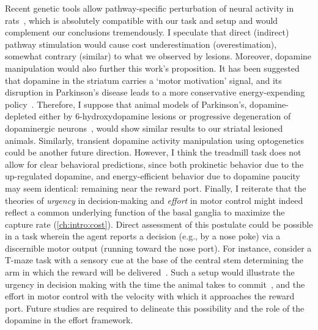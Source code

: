 Recent genetic tools allow pathway-specific perturbation of neural activity in rats~\cite{Pettibone2019eNeuro}, which is absolutely compatible with our task and setup and would complement our conclusions tremendously.
I speculate that direct (indirect) pathway stimulation would cause cost underestimation (overestimation), somewhat contrary (similar) to what we observed by lesions.
Moreover, dopamine manipulation would also further this work's proposition.
It has been suggested that dopamine in the striatum carries a `motor motivation' signal, and its disruption in Parkinson's disease leads to a more conservative energy-expending policy~\cite{Mazzoni2007}.
Therefore, I suppose that animal models of Parkinson's, dopamine-depleted either by 6-hydroxydopamine lesions or progressive degeneration of dopaminergic neurons~\cite{Panigrahi2015Cell}, would show similar results to our striatal lesioned animals.
Similarly, transient dopamine activity manipulation using optogenetics could be another future direction.
However, I think the treadmill task does not allow for clear behavioral predictions, since both prokinetic behavior due to the up-regulated dopamine, and energy-efficient behavior due to dopamine paucity may seem identical:
remaining near the reward port.
Finally, I reiterate that the theories of \emph{urgency} in decision-making and \emph{effort} in motor control might indeed reflect a common underlying function of the basal ganglia to maximize the capture rate (\autoref{ch:intro:cost}).
Direct assessment of this postulate could be possible in a task wherein the agent reports a decision (e.g., by a nose poke) via a discernible motor output (running toward the nose port).
For instance, consider a T-maze task with a sensory cue at the base of the central stem determining the arm in which the reward will be delivered~\cite[i.e., a combination of][]{Zuo2019CurrBiol,Engelhard2019N}.
Such a setup would illustrate the urgency in decision making with the time the animal takes to commit~\cite{Thura2017Neruon}, and the effort in motor control with the velocity with which it approaches the reward port.
Future studies are required to delineate this possibility and the role of the dopamine in the effort framework.